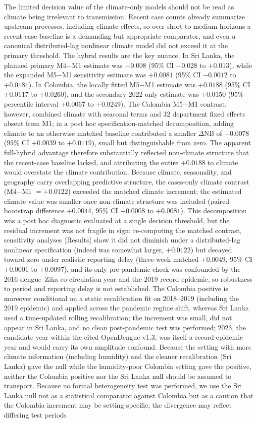 \documentclass[11pt,a4paper]{article}
\begin{document}
The limited decision value of the climate-only models should not be read as climate being irrelevant to transmission. Recent case counts already summarize upstream processes, including climate effects, so over short-to-medium horizons a recent-case baseline is a demanding but appropriate comparator, and even a canonical distributed-lag nonlinear climate model did not exceed it at the primary threshold. The hybrid results are the key nuance. In Sri Lanka, the planned primary M4$-$M1 estimate was $-0.008$ (95\% CI $-0.028$ to $+0.013$), while the expanded M5$-$M1 sensitivity estimate was $+0.0081$ (95\% CI $-0.0012$ to $+0.0181$). In Colombia, the locally fitted M5$-$M1 estimate was $+0.0188$ (95\% CI $+0.0117$ to $+0.0260$), and the secondary 2022-only estimate was $+0.0150$ (95\% percentile interval $+0.0067$ to $+0.0249$). The Colombia M5$-$M1 contrast, however, combined climate with seasonal terms and 32 department fixed effects absent from M1; in a post hoc specification-matched decomposition, adding climate to an otherwise matched baseline contributed a smaller $\Delta$NB of $+0.0078$ (95\% CI $+0.0039$ to $+0.0119$), small but distinguishable from zero. The apparent full-hybrid advantage therefore substantially reflected non-climate structure that the recent-case baseline lacked, and attributing the entire $+0.0188$ to climate would overstate the climate contribution. Because climate, seasonality, and geography carry overlapping predictive structure, the cases-only climate contrast (M4$-$M1 $=+0.0122$) exceeded the matched climate increment; the estimated climate value was smaller once non-climate structure was included (paired-bootstrap difference $+0.0044$, 95\% CI $+0.0008$ to $+0.0081$). This decomposition was a post hoc diagnostic evaluated at a single decision threshold, but the residual increment was not fragile in sign: re-computing the matched contrast, sensitivity analyses (Results) show it did not diminish under a distributed-lag nonlinear specification (indeed was somewhat larger, $+0.0122$) but decayed toward zero under realistic reporting delay (three-week matched $+0.0049$, 95\% CI $+0.0001$ to $+0.0097$), and its only pre-pandemic check was confounded by the 2016 dengue--Zika co-circulation year and the 2019 record epidemic, so robustness to period and reporting delay is not established. The Colombia positive is moreover conditional on a static recalibration fit on 2018--2019 (including the 2019 epidemic) and applied across the pandemic regime shift, whereas Sri Lanka used a time-updated rolling recalibration; the increment was small, did not appear in Sri Lanka, and no clean post-pandemic test was performed; 2023, the candidate year within the cited OpenDengue v1.3, was itself a record-epidemic year and would carry its own amplitude confound. Because the setting with more climate information (including humidity) and the cleaner recalibration (Sri Lanka) gave the null while the humidity-poor Colombia setting gave the positive, neither the Colombia positive nor the Sri Lanka null should be assumed to transport. Because no formal heterogeneity test was performed, we use the Sri Lanka null not as a statistical comparator against Colombia but as a caution that the Colombia increment may be setting-specific; the divergence may reflect differing test periods 
\end{document}
